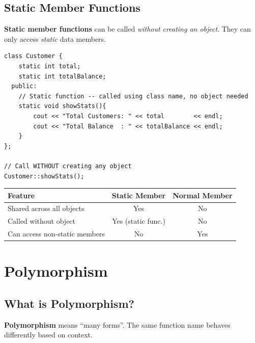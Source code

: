 \documentclass[12pt,a4paper]{report}
\begin{document}
\section{Static Member Functions}

\textbf{Static member functions} can be called \textit{without creating an object}.
They can only access \textit{static} data members.

\begin{lstlisting}[caption={Static member function}]
class Customer {
    static int total;
    static int totalBalance;
  public:
    // Static function -- called using class name, no object needed
    static void showStats(){
        cout << "Total Customers: " << total        << endl;
        cout << "Total Balance  : " << totalBalance << endl;
    }
};

// Call WITHOUT creating any object
Customer::showStats();
\end{lstlisting}

\begin{center}
\begin{tabular}{|l|c|c|}
\hline
\textbf{Feature}              & \textbf{Static Member} & \textbf{Normal Member} \\
\hline
Shared across all objects     & Yes & No \\
Called without object         & Yes (static func.) & No \\
Can access non-static members & No  & Yes \\
\hline
\end{tabular}
\end{center}

\chapter{Polymorphism}

\section{What is Polymorphism?}

\textbf{Polymorphism} means ``many forms''. The same function name behaves differently based on context.
\end{document}
